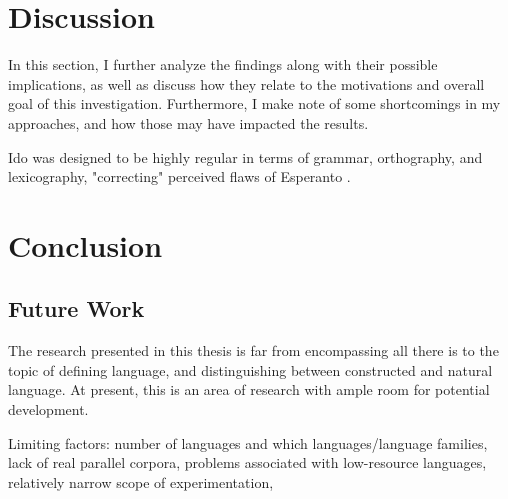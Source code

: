 \documentclass[12pt,a4paper]{article}
\numberwithin{figure}{section}
\numberwithin{table}{section}
\numberwithin{definition}{section}
\begin{document}
\clearpage
\newpage
\section{Discussion}
\label{sec:discussion}


In this section, I further analyze the findings along with their possible implications, as well as discuss how they relate to the motivations and overall goal of this investigation. Furthermore, I make note of some shortcomings in my approaches, and how those may have impacted the results.

Ido was designed to be highly regular in terms of grammar, orthography, and lexicography, "correcting" perceived flaws of Esperanto \parencite{Novikov2022article}.

\newpage
\section{Conclusion}
\label{sec:conclusion}



\subsection{Future Work}
\label{ssec:futurework}

The research presented in this thesis is far from encompassing all there is to the topic of defining language, and distinguishing between constructed and natural language. At present, this is an area of research with ample room for potential development. 

Limiting factors: number of languages and which languages/language families, lack of real parallel corpora, problems associated with low-resource languages, relatively narrow scope of experimentation,
\end{document}
